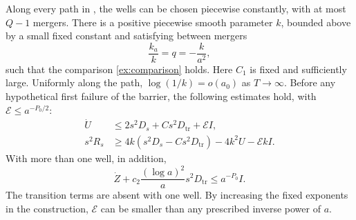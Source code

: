 \begin{proposition}
\label{ex:barrier}
Along every path in , the wells can be chosen
piecewise constantly, with at most \(Q-1\) mergers. There is a
positive piecewise smooth parameter \(k\), bounded above by a small
fixed constant and satisfying between mergers
\begin{equation}
 \frac{k_a}{k}=q=-\frac{k}{a^2},
 \label{ex:k-evolution}
\end{equation}
such that the comparison \eqref{ex:comparison} holds.
Here \(C_1\) is fixed and sufficiently large. Uniformly along the
path, \(\log(1/k)=o(a_0)\) as \(T\to\infty\).
Before any hypothetical first failure of the barrier, the following
estimates hold, with \(\mathcal E\le a^{-P_0/2}\):
\begin{align}
 \dot U&\le2s^2D_s+Cs^2D_{\mathrm{tr}}+\mathcal E I,
 \label{ex:moment-derivative}\\
 s^2R_s&\ge4k(s^2D_s-Cs^2D_{\mathrm{tr}})
             -4k^2U-\mathcal E kI.
 \label{ex:radial-bound}
\end{align}
With more than one well, in addition,
\begin{equation}
 \dot Z+c_2\frac{(\log a)^2}{a}s^2D_{\mathrm{tr}}
       \le a^{-P_0}I.
 \label{ex:transition}
\end{equation}
The transition terms are absent with one well. By increasing the
fixed exponents in the construction, \(\mathcal E\) can be smaller
than any prescribed inverse power of \(a\).
\end{proposition}

